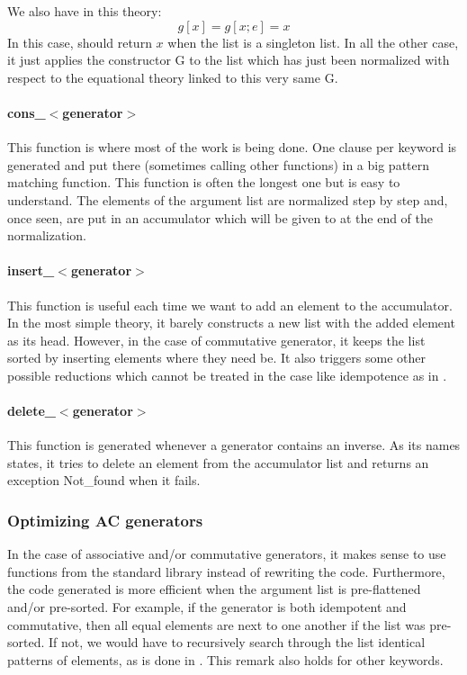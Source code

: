  We also have in this theory:
\[
  g [x] = g [x; e]  =  x 
\]
In this case,  should return $x$ when the list is a singleton
list. In all the other case, it just applies the constructor {\sf
  G} to the list which has just been normalized with respect to the
equational theory linked to this very same {\sf G}.

\paragraph{cons\_$<$generator$>$}
This function is where most of the work is being done. One clause per
keyword is generated and put there (sometimes calling other
functions) in a big pattern matching function. This function is often
the longest one but is easy to understand. The elements of the
argument list are normalized step by step and, once seen, are put in
an accumulator which will be given to \return at the end of the normalization.

\paragraph{insert\_$<$generator$>$}
This function is useful each time we want to add an element to the
accumulator. In the most simple theory, it barely constructs a new
list with the added element as its head. However, in the case of
commutative generator, it keeps the list sorted by inserting elements
where they need be. It also triggers some other possible reductions
which cannot be treated in the case like idempotence as in .

\paragraph{delete\_$<$generator$>$}
This function is generated whenever a generator contains an
inverse. As its names states, it tries to delete an element from the
accumulator list and returns an exception {\sf Not\_found} when it fails.



\subsubsection{Optimizing AC generators}
\label{sec:acgenopt}

In the case of associative and/or commutative generators, it makes
sense to use functions from the \ocaml standard library instead of
rewriting the code. Furthermore, the code generated is more efficient
when the argument list is pre-flattened and/or pre-sorted. For
example, if the generator is both idempotent and commutative, then 
all equal elements are next to one another if the list was
pre-sorted. If not, we would have to recursively search through the
list identical patterns of elements, as is done in 
. This remark also holds for other \moca keywords.

